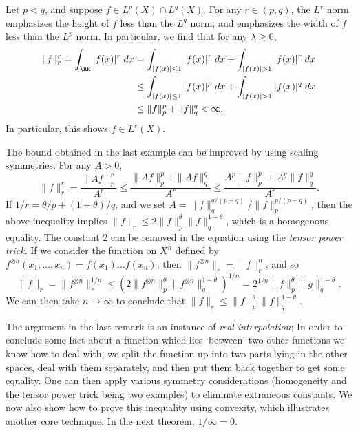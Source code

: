 \begin{example}
  Let $p < q$, and suppose $f \in L^p(X) \cap L^q(X)$. For any $r \in (p,q)$, the $L^r$ norm emphasizes the height of $f$ less than the $L^q$ norm, and emphasizes the width of $f$ less than the $L^p$ norm. In particular, we find that for any $\lambda \geq 0$,
  \begin{align*}
    \| f \|_r^r = \int_{\RR} |f(x)|^r\; dx &= \int_{|f(x)| \leq 1} |f(x)|^r\; dx + \int_{|f(x)| > 1} |f(x)|^r\; dx\\
    &\leq \int_{|f(x)| \leq 1} |f(x)|^p\; dx + \int_{|f(x)| > 1} |f(x)|^q\; dx\\
    &\leq \| f \|_p^p + \| f \|_q^q < \infty.
  \end{align*}
  In particular, this shows $f \in L^r(X)$.
\end{example}

\begin{remark}
    The bound obtained in the last example can be improved by using scaling symmetries. For any $A > 0$,
    \[ \| f \|_r^r = \frac{\| Af \|_r^r}{A^r} \leq \frac{\| Af \|_p^p + \| Af \|_q^q}{A^r} \leq \frac{A^p \| f \|_p^p + A^q \| f \|_q^q}{A^r}. \]
    If $1/r = \theta/p + (1 - \theta)/q$, and we set $A = \| f \|_q^{q/(p-q)} / \| f \|_p^{p/(p-q)}$, then the above inequality implies $\| f \|_r \leq 2 \| f \|_p^\theta \| f \|_q^{1 - \theta}$, which is a homogenous equality. The constant 2 can be removed in the equation using the {\it tensor power trick}. If we consider the function on $X^n$ defined by $f^{\otimes n}(x_1, \dots, x_n) = f(x_1) \dots f(x_n)$, then $\| f^{\otimes n} \|_r = \| f \|_r^n$, and so
    \[ \| f \|_r = \| f^{\otimes n} \|_r^{1/n} \leq \left( 2 \| f^{\otimes n} \|_p^\theta \| f^{\otimes n} \|_q^{1-\theta} \right)^{1/n} = 2^{1/n} \| f \|_p^\theta \| g \|_q^{1-\theta}. \]
    We can then take $n \to \infty$ to conclude that $\| f \|_r \leq \| f \|_p^\theta \| f \|_q^{1-\theta}$.
\end{remark}

The argument in the last remark is an instance of \emph{real interpolation}; In order to conclude some fact about a function which lies `between' two other functions we know how to deal with, we split the function up into two parts lying in the other spaces, deal with them separately, and then put them back together to get some equality. One can then apply various symmetry considerations (homogeneity and the tensor power trick being two examples) to eliminate extraneous constants. We now also show how to prove this inequality using convexity, which illustrates another core technique. In the next theorem, $1/\infty = 0$.

